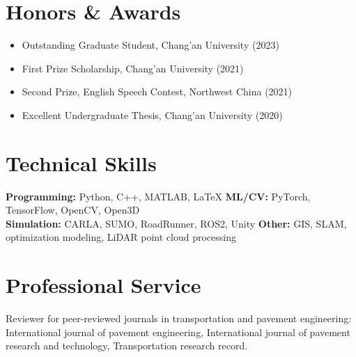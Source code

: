 \documentclass[11pt,a4paper]{article}
\begin{document}
\section*{Honors \& Awards}
\begin{itemize}[leftmargin=1.2em]
    \item Outstanding Graduate Student, Chang'an University (2023)
    \item First Prize Scholarship, Chang'an University (2021)
    \item Second Prize, English Speech Contest, Northwest China (2021)
    \item Excellent Undergraduate Thesis, Chang'an University (2020)
\end{itemize}

\section*{Technical Skills}
\textbf{Programming:} Python, C++, MATLAB, LaTeX \quad
\textbf{ML/CV:} PyTorch, TensorFlow, OpenCV, Open3D \\
\textbf{Simulation:} CARLA, SUMO, RoadRunner, ROS2, Unity \quad
\textbf{Other:} GIS, SLAM, optimization modeling, LiDAR point cloud processing

\section*{Professional Service}
Reviewer for peer-reviewed journals in transportation and pavement engineering: International journal of pavement engineering, International journal of pavement research and technology, Transportation research record.
\end{document}
